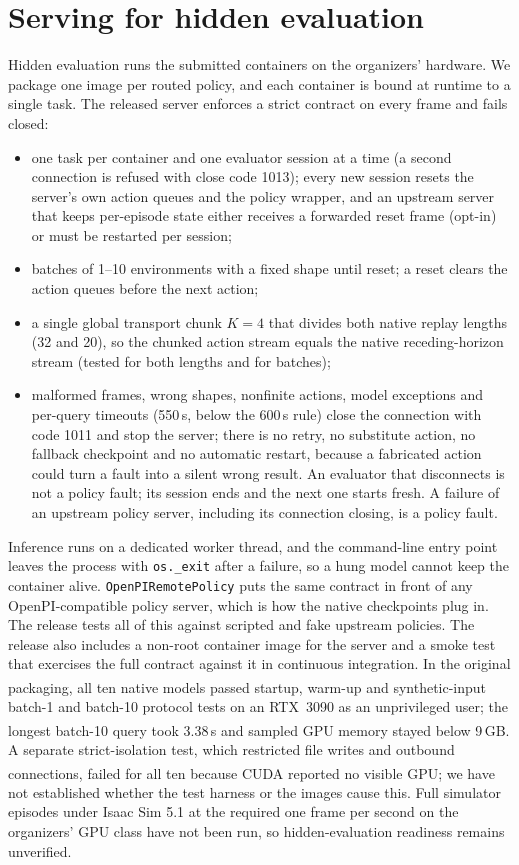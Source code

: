 \documentclass[10pt]{article}
\newcommand{\code}[1]{\texttt{#1}}
\newcommand{\pl}{\textsuperscript{\dag}}
\begin{document}
\section{Serving for hidden evaluation}
\label{sec:serving}
Hidden evaluation runs the submitted containers on the organizers' hardware. We package one image per routed policy, and each container is bound at runtime to a single task. The released server enforces a strict contract on every frame and fails closed:
\begin{itemize}
\item one task per container and one evaluator session at a time (a second connection is refused with close code 1013); every new session resets the server's own action queues and the policy wrapper, and an upstream server that keeps per-episode state either receives a forwarded reset frame (opt-in) or must be restarted per session;
\item batches of 1--10 environments with a fixed shape until reset; a reset clears the action queues before the next action;
\item a single global transport chunk $K=4$ that divides both native replay lengths (32 and 20), so the chunked action stream equals the native receding-horizon stream (tested for both lengths and for batches);
\item malformed frames, wrong shapes, nonfinite actions, model exceptions and per-query timeouts (550\,s, below the 600\,s rule) close the connection with code 1011 and stop the server; there is no retry, no substitute action, no fallback checkpoint and no automatic restart, because a fabricated action could turn a fault into a silent wrong result. An evaluator that disconnects is not a policy fault; its session ends and the next one starts fresh. A failure of an upstream policy server, including its connection closing, is a policy fault.
\end{itemize}
Inference runs on a dedicated worker thread, and the command-line entry point leaves the process with \code{os.\_exit} after a failure, so a hung model cannot keep the container alive. \code{OpenPIRemotePolicy} puts the same contract in front of any OpenPI-compatible policy server, which is how the native checkpoints plug in. The release tests all of this against scripted and fake upstream policies. The release also includes a non-root container image for the server and a smoke test that exercises the full contract against it in continuous integration. In the original packaging, all ten native models passed\pl{} startup, warm-up and synthetic-input batch-1 and batch-10 protocol tests on an RTX~3090 as an unprivileged user; the longest batch-10 query took 3.38\pl\,s and sampled GPU memory stayed below 9\pl\,GB. A separate strict-isolation test, which restricted file writes and outbound connections, failed for all ten because CUDA reported no visible GPU\pl; we have not established whether the test harness or the images cause this. Full simulator episodes under Isaac Sim 5.1 at the required one frame per second on the organizers' GPU class have not been run, so hidden-evaluation readiness remains unverified.
\end{document}

